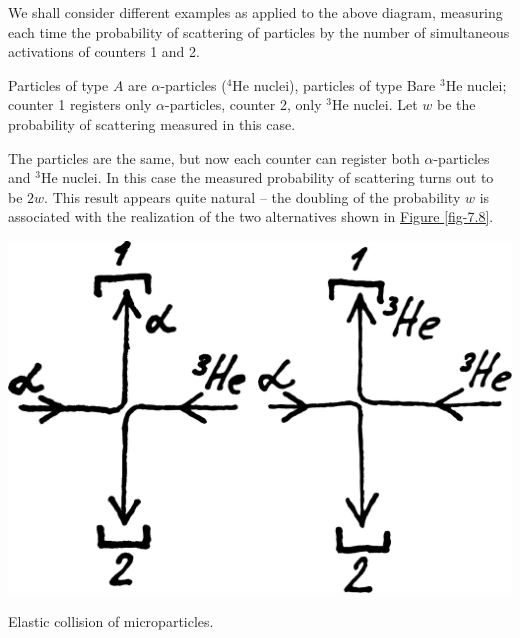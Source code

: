 \documentclass[a4paper,sfsidenotes,colorlinks=true]{tufte-book}
\numberwithin{equation}{section}
\numberwithin{figure}{section}
\begin{document}
We shall consider different examples as applied to the above diagram, measuring each time the probability of scattering of particles by the number of simultaneous activations of counters \textsf{1} and \textsf{2}.

\begin{description}[font=\bfseries, leftmargin=1cm]
\item[First Example.] Particles of type $A$ are $\alpha$-particles
  ($^{4}$He nuclei), particles of type Bare $^{3}$He nuclei; counter
  \textsf{1} registers only $\alpha$-particles, counter \textsf{2},
  only $^{3}$He nuclei. Let $w$ be the probability of scattering
  measured in this case.

\item[Second example.] The particles are the same, but now each
  counter can register both $\alpha$-particles and $^{3}$He nuclei. In
  this case the measured probability of scattering turns out to be
  $2w$. This result appears quite natural -- the doubling of the probability $w$ is associated with the realization of the two alternatives shown in \hyperref[fig-7.8]{Figure \ref{fig-7.8}}.

\begin{marginfigure}%
\centering
\includegraphics[width=\textwidth]{figures/fig-07-08.pdf}
\caption{Elastic collision of microparticles.}
\label{fig-7.8}
\end{marginfigure}


\end{description}
\end{document}
